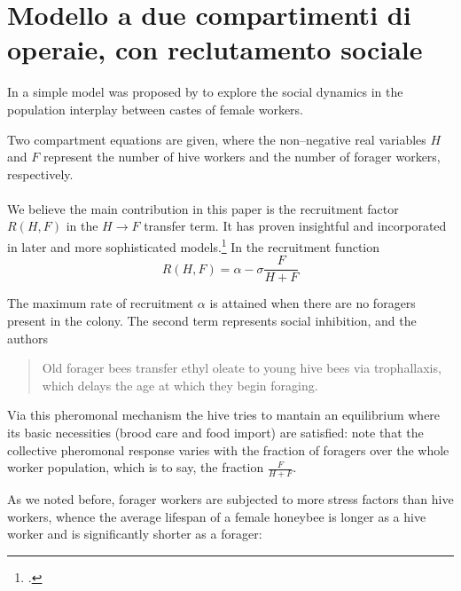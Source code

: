 \section{Modello a due compartimenti di operaie, con reclutamento sociale}

In \citeyear{khoury2011} a simple model was proposed by \citeauthor{khoury2011} to explore the social dynamics in the population interplay between castes of female workers.

Two compartment equations are given, where the non--negative real variables $H$ and $F$ represent the number of hive workers and the number of forager workers, respectively.

\paragraph{}
We believe the main contribution in this paper is the recruitment factor $R(H,F)$ in the $H \to F$ transfer term.
It has proven insightful and incorporated in later and more sophisticated models.\footcite{ratti2017}
In the recruitment function
\begin{equation}
    \label{eq:Recr}
    R(H,F) = \alpha - \sigma \frac{F}{H+F}
\end{equation}

The maximum rate of recruitment $\alpha$ is attained when there are no foragers present in the colony.
The second term represents social inhibition, and the authors 

\blockquote[{\cite[1]{khoury2011}}]{Old forager bees transfer ethyl oleate to young hive bees via trophallaxis, which delays the age at which they begin foraging.}

Via this pheromonal mechanism the hive tries to mantain an equilibrium where its basic necessities (brood care and food import) are satisfied: note that the collective pheromonal response varies with the fraction of foragers over the whole worker population, which is to say, the fraction $\frac{F}{H+F}$.

As we noted before, forager workers are subjected to more stress factors than hive workers, whence the average lifespan of a female honeybee is longer as a hive worker and is significantly shorter as a forager: 



